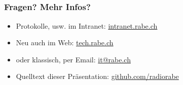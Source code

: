 \documentclass{beamer}
\begin{document}
  \subsection*{}

  \frame
  {
    \frametitle{Fragen? Mehr Infos?}

    \begin{itemize}
    \item{Protokolle, usw. im Intranet: \hyperref{https://intranet.rabe.ch}{}{}{intranet.rabe.ch}}
    \item{Neu auch im Web: \hyperref{http://tech.rabe.ch}{}{}{tech.rabe.ch}}
    \item{oder klassisch, per Email: \hyperref{mailto:it@rabe.ch}{}{}{it@rabe.ch}}
    \item{Quelltext dieser Pr\"asentation: \hyperref{https://github.com/radiorabe}{}{}{github.com/radiorabe}}
    \end{itemize}
    
  }
\end{document}
